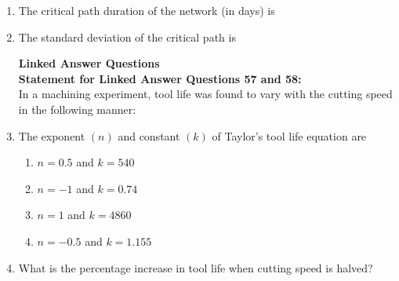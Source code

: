 \documentclass[journal]{IEEEtran}
\begin{document}
\begin{enumerate}[leftmargin=0pt]
\begin{table}[h]
\end{table}
\newpage


\item The critical path duration of the network (in days) is
\begin{enumerate}
\hfill{}
\end{enumerate}
\item The standard deviation of the critical path is
\begin{enumerate}
\hfill{}
\end{enumerate}

\textbf{Linked Answer Questions}\\
\textbf{Statement for Linked Answer Questions 57 and 58:}\\
In a machining experiment, tool life was found to vary with the cutting speed in the following manner:
\begin{table}[h]
    \centering
    
   
\end{table}

\item The exponent $(n)$ and constant $(k)$ of Taylor's tool life equation are
\begin{enumerate}
  \item $n=0.5$ and $k=540$
  \item $n=-1$ and $k=0.74$
  \item $n=1$ and $k=4860$
  \item $n=-0.5$ and $k=1.155$
\hfill{}
\end{enumerate}

\item What is the percentage increase in tool life when cutting speed is halved?
\begin{enumerate}
\hfill{}
\end{enumerate}


\end{enumerate}
\end{document}
